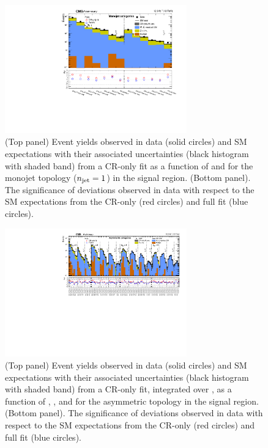 \begin{figure}[!h]
  \begin{center}
    \includegraphics[width=0.7\textwidth]{summaryPlot_Monojet_prefit_overlay_fit_b}
    \caption{(Top panel) Event yields observed in data (solid circles)
      and SM expectations with their associated uncertainties (black
      histogram with shaded band) from a CR-only fit as a function of
      \nb and \scalht for the monojet topology ($n_{\text{jet}} = 1$) in the
      signal region. (Bottom panel). The significance of deviations
      observed in data with respect to the SM expectations from the
      CR-only (red circles) and full fit (blue circles). }
    \label{fig:mono}
  \end{center}
\end{figure}

\begin{figure}[!h]
  \begin{center}
    \includegraphics[angle=90,width=0.7\textwidth]{summaryPlot_Asymmetric_prefit_overlay_fit_b}
    \caption{(Top panel) Event yields observed in data (solid circles)
      and SM expectations with their associated uncertainties (black
      histogram with shaded band) from a CR-only fit, integrated over
      \HTmiss, as a function of \njet, \nb, and \scalht for the
      asymmetric topology in the signal region. (Bottom panel). The
      significance of deviations observed in data with respect to the
      SM expectations from the CR-only (red circles) and full fit
      (blue circles). }
    \label{fig:asym}
  \end{center}
\end{figure}

